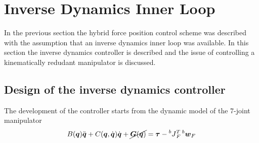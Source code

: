\section{Inverse Dynamics Inner Loop}
In the previous section the hybrid force position control scheme was described
with the assumption that an inverse dynamics inner loop was available. In this
section the inverse dynamics controller is described and the issue of controlling
a kinematically redudant manipulator is discussed.

\subsection{Design of the inverse dynamics controller}
The development of the controller starts from the dynamic model of the 7-joint
manipulator
\begin{equation}\label{eq:joint_space_dyn}
  B(\vec{q}) \ddot{\vec{q}} + C(\vec{q}, \dot{\vec{q}}) \dot{\vec{q}} + \cancel{\vec{G}(\vec{q})} = \vec{\tau}
  -\prescript{b}{}{J}^{T}_{F} \prescript{b}{}{\vec{w}}_{F}
\end{equation}

